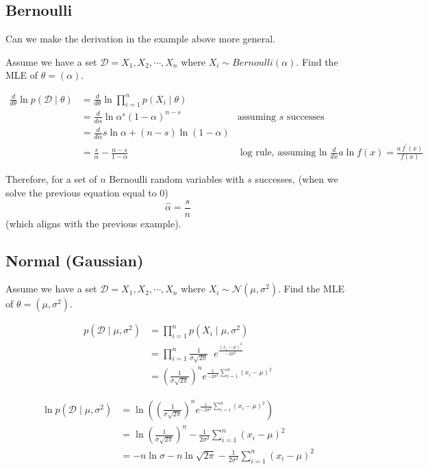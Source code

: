 \subsection{Bernoulli}

Can we make the derivation in the example above more general. 

Assume we have a set $\mathcal{D} = X_1, X_2, \cdots, X_n$ 
where $X_i \sim Bernoulli(\alpha)$.
Find the MLE of $\theta=(\alpha)$.

\begin{align*}
\frac{d}{d\theta} \ln p(\mathcal{D}\mid\theta) 	&= \frac{d}{d\theta} \ln \prod_{i=1}^n p(X_i\mid\theta)\\
					    		     	&= \frac{d}{d\alpha} \ln \alpha^s(1-\alpha)^{n-s} & \text{assuming $s$ successes}\\
					    			& = \frac{d}{d\alpha} s \ln \alpha + (n-s) \ln (1-\alpha)\\
								& = \frac{s}{\alpha} - \frac{n-s}{1-\alpha} 		& \text{log rule, assuming $\ln$} \frac{d}{dx} a \ln f(x) = \frac{a\,f^\prime(x)}{f(x)}			     
\end{align*}

Therefore, for a set of $n$ Bernoulli random variables with $s$ successes, (when we solve the previous equation equal to 0) 
\[\hat\alpha = \frac{s}{n}\]
(which aligns with the previous example). 

\subsection{Normal (Gaussian)}
Assume we have a set $\mathcal{D} = X_1, X_2, \cdots, X_n$ 
where $X_i \sim \mathcal{N}(\mu, \sigma^2)$.
Find the MLE of $\theta = (\mu,\sigma^2)$.

\begin{align*}
p(\mathcal{D}\mid\mu,\sigma^2) & = \prod_{i=1}^n p(X_i\mid\mu,\sigma^2)\\
						& = \prod_{i=1}^n \frac{1}{\sigma\sqrt{2\pi}}\;\;e^{\frac{(x_i-\mu)^2}{-2\sigma^2}}\\
						& = \left( \frac{1}{\sigma\sqrt{2\pi}}\right)^n e^{\frac{1}{-2\sigma^2}\sum_{i=1}^n (x_i-\mu)^2}		     
\end{align*}

\begin{align*}
\ln p(\mathcal{D}\mid\mu,\sigma^2) 
						& = \ln \left(\left( \frac{1}{\sigma\sqrt{2\pi}}\right)^n e^{\frac{1}{-2\sigma^2}\sum_{i=1}^n (x_i-\mu)^2}\right)	\\
						& = \ln \left( \frac{1}{\sigma\sqrt{2\pi}}\right)^n - \frac{1}{2\sigma^2}\sum_{i=1}^n (x_i-\mu)^2	\\	
						& = -n \ln \sigma - n \ln \sqrt{2\pi} - \frac{1}{2\sigma^2}\sum_{i=1}^n (x_i-\mu)^2	\\	     
\end{align*}

